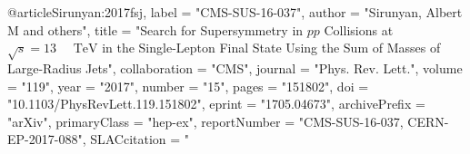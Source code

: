 @article{Sirunyan:2017fsj,
      label          = "CMS-SUS-16-037",
      author         = "Sirunyan, Albert M and others",
      title          = "{Search for Supersymmetry in $pp$ Collisions at
                        $\sqrt{s}=13\text{ }\text{ }\mathrm{TeV}$ in the
                        Single-Lepton Final State Using the Sum of Masses of
                        Large-Radius Jets}",
      collaboration  = "CMS",
      journal        = "Phys. Rev. Lett.",
      volume         = "119",
      year           = "2017",
      number         = "15",
      pages          = "151802",
      doi            = "10.1103/PhysRevLett.119.151802",
      eprint         = "1705.04673",
      archivePrefix  = "arXiv",
      primaryClass   = "hep-ex",
      reportNumber   = "CMS-SUS-16-037, CERN-EP-2017-088",
      SLACcitation   = "%
}

